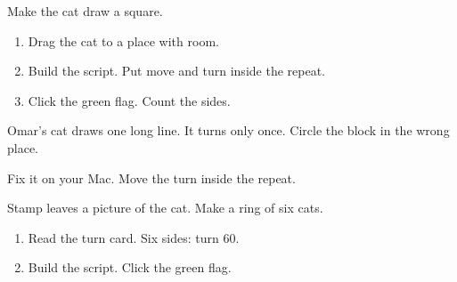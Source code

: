 \begin{exercise}
Make the cat draw a square.
\begin{enumerate}[leftmargin=1.4em,itemsep=2pt]
  \item Drag the cat to a place with room.
  \item Build the script. Put move and turn inside the repeat.
  \item Click the green flag. Count the sides.
\end{enumerate}
\begin{center}
\begin{scratch}[scale=0.85]
\end{scratch}
\end{center}
\end{exercise}

\begin{exercise}
Omar's cat draws one long line. It turns only once. Circle the block in the wrong place.
\begin{center}
\begin{scratch}[scale=0.85]
\end{scratch}
\end{center}
Fix it on your Mac. Move the turn inside the repeat.
\end{exercise}

\begin{exercise}
Stamp leaves a picture of the cat. Make a ring of six cats.
\begin{enumerate}[leftmargin=1.4em,itemsep=2pt]
  \item Read the turn card. Six sides: turn 60.
  \item Build the script. Click the green flag.
\end{enumerate}
\begin{center}
\begin{scratch}[scale=0.85]
\end{scratch}
\end{center}
\end{exercise}

